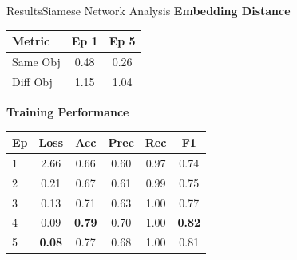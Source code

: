 \documentclass[10pt]{beamer}
\begin{document}
	\begin{frame}{Results}{Siamese Network Analysis}
		\centering
		\scriptsize
		\textbf{Embedding Distance}
		\vspace{0.1cm}
		
		\begin{tabular}{lcc}
			\toprule
			Metric & Ep 1 & Ep 5 \\
			\midrule
			Same Obj & 0.48 & 0.26 \\
			Diff Obj & 1.15 & 1.04 \\
			\bottomrule
		\end{tabular}
		
		\vspace{0.3cm}
		
		\scriptsize
		\textbf{Training Performance}
		\vspace{0.15cm}
		
		\begin{tabular}{lccccc}
			\toprule
			Ep & Loss & Acc & Prec & Rec & F1 \\
			\midrule
			1 & 2.66 & 0.66 & 0.60 & 0.97 & 0.74 \\
			2 & 0.21 & 0.67 & 0.61 & 0.99 & 0.75 \\
			3 & 0.13 & 0.71 & 0.63 & 1.00 & 0.77 \\
			4 & 0.09 & \textbf{0.79} & 0.70 & 1.00 & \textbf{0.82} \\
			5 & \textbf{0.08} & 0.77 & 0.68 & 1.00 & 0.81 \\
			\bottomrule
		\end{tabular}
	\end{frame}
	
\end{document}
